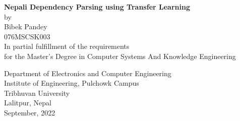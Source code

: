 \begin{titlingpage} 
\begin{center}
\textbf{Nepali Dependency Parsing using Transfer Learning}\\
\vspace{2cm}
by\\
Bibek Pandey\\
076MSCSK003\\
\vspace{3cm}
\vspace{3cm}
In partial fulfillment of the requirements\\
for the Master’s Degree in Computer Systems And Knowledge Engineering
\vspace{2cm}

Department of Electronics and Computer Engineering\\
Institute of Engineering, Pulchowk Campus\\
Tribhuvan University\\
Lalitpur, Nepal\\
\vspace{2cm}
September, 2022
\end{center}
\end{titlingpage}
\newpage
